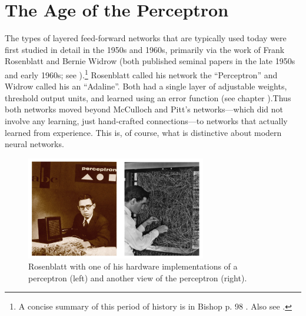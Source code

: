 \section{The Age of the Perceptron}\label{ageOfPerceptron}

The types of layered feed-forward networks that  are typically used today were first studied in detail in the 1950s and 1960s, primarily via the work of Frank Rosenblatt and Bernie Widrow (both published seminal papers in the late 1950s and early 1960s; see \cite{widrow1960adaptive}).\footnote{A concise summary of this period of history is in Bishop p. 98 \cite{bishop1995neural}. Also see \cite{widrow1960adaptive}.}  Rosenblatt called his network the ``Perceptron'' and Widrow called his an ``Adaline''. Both had a single layer of adjustable weights, threshold output units, and learned using an error function (see chapter ).Thus both networks moved beyond McCulloch and Pitt's networks---which did not involve any learning, just hand-crafted connections---to networks that actually learned from experience. This is, of course, what is distinctive about modern neural networks.

\begin{figure}[h]
\centering
\includegraphics[width=0.7\textwidth]{images/perceptron.png}
\caption[Left: \url{http://www.rutherfordjournal.org/images/TAHC_rosenblatt-sepia.jpg}; Right: \url{http://www.newyorker.com/wp-content/uploads/2012/11/frank-rosenblatt-perception.jpg}]{Rosenblatt with one of his hardware implementations of a perceptron (left) and another view of the perceptron (right). }
\label{perceptron}
\end{figure}

